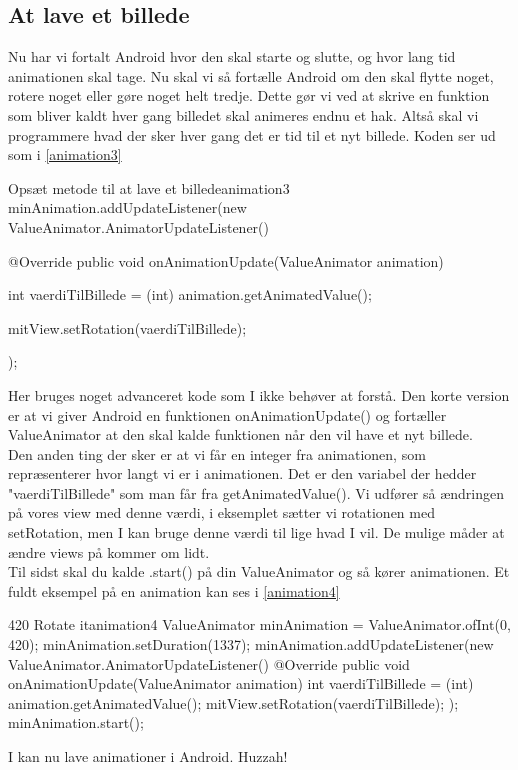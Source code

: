 \subsection{At lave et billede}
Nu har vi fortalt Android hvor den skal starte og slutte, og hvor lang tid animationen skal tage. Nu skal vi så fortælle Android om den skal flytte noget, rotere noget eller gøre noget helt tredje. Dette gør vi ved at skrive en funktion som bliver kaldt hver gang billedet skal animeres endnu et hak. Altså skal vi programmere hvad der sker hver gang det er tid til et nyt billede. Koden ser ud som i \autoref{animation3}
\begin{JavaCode}{Opsæt metode til at lave et billede}{animation3}
	minAnimation.addUpdateListener(new ValueAnimator.AnimatorUpdateListener() {
		@Override
		public void onAnimationUpdate(ValueAnimator animation) {
			int vaerdiTilBillede = (int) animation.getAnimatedValue();
			
			mitView.setRotation(vaerdiTilBillede);
		}
	});
\end{JavaCode}
Her bruges noget advanceret kode som I ikke behøver at forstå. Den korte version er at vi giver Android en funktionen onAnimationUpdate() og fortæller ValueAnimator at den skal kalde funktionen når den vil have et nyt billede.\\
Den anden ting der sker er at vi får en integer fra animationen, som repræsenterer hvor langt vi er i animationen. Det er den variabel der hedder "vaerdiTilBillede" som man får fra getAnimatedValue(). Vi udfører så ændringen på vores view med denne værdi, i eksemplet sætter vi rotationen med setRotation, men I kan bruge denne værdi til lige hvad I vil. De mulige måder at ændre views på kommer om lidt.\\
Til sidst skal du kalde .start() på din ValueAnimator og så kører animationen. Et fuldt eksempel på en animation kan ses i \autoref{animation4}
\begin{JavaCode}{420 Rotate it}{animation4}
	ValueAnimator minAnimation = ValueAnimator.ofInt(0, 420);
	minAnimation.setDuration(1337);
	minAnimation.addUpdateListener(new ValueAnimator.AnimatorUpdateListener() {
		@Override
		public void onAnimationUpdate(ValueAnimator animation) {
			int vaerdiTilBillede = (int) animation.getAnimatedValue();
			mitView.setRotation(vaerdiTilBillede);
		}
	});
	minAnimation.start();
\end{JavaCode}
I kan nu lave animationer i Android. Huzzah!

